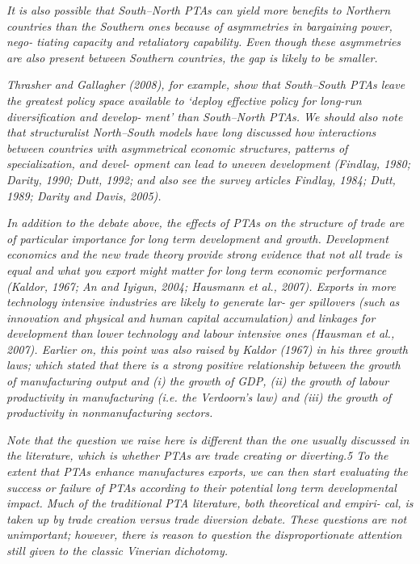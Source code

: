 \emph{It is also possible that South--North PTAs can yield more benefits
to Northern countries than the Southern ones because of asymmetries in
bargaining power, nego- tiating capacity and retaliatory capability.
Even though these asymmetries are also present between Southern
countries, the gap is likely to be smaller.}

\emph{Thrasher and Gallagher (2008), for example, show that South--South
PTAs leave the greatest policy space available to `deploy effective
policy for long-run diversification and develop- ment' than South--North
PTAs. We should also note that structuralist North--South models have
long discussed how interactions between countries with asymmetrical
economic structures, patterns of specialization, and devel- opment can
lead to uneven development (Findlay, 1980; Darity, 1990; Dutt, 1992; and
also see the survey articles Findlay, 1984; Dutt, 1989; Darity and
Davis, 2005).}

\emph{In addition to the debate above, the effects of PTAs on the
structure of trade are of particular importance for long term
development and growth. Development economics and the new trade theory
provide strong evidence that not all trade is equal and what you export
might matter for long term economic performance (Kaldor, 1967; An and
Iyigun, 2004; Hausmann et al., 2007). Exports in more technology
intensive industries are likely to generate lar- ger spillovers (such as
innovation and physical and human capital accumulation) and linkages for
development than lower technology and labour intensive ones (Hausman et
al., 2007). Earlier on, this point was also raised by Kaldor (1967) in
his three growth laws; which stated that there is a strong positive
relationship between the growth of manufacturing output and (i) the
growth of GDP, (ii) the growth of labour productivity in manufacturing
(i.e. the Verdoorn's law) and (iii) the growth of productivity in
nonmanufacturing sectors.}

\emph{Note that the question we raise here is different than the one
usually discussed in the literature, which is whether PTAs are trade
creating or diverting.5 To the extent that PTAs enhance manufactures
exports, we can then start evaluating the success or failure of PTAs
according to their potential long term developmental impact. Much of the
traditional PTA literature, both theoretical and empiri- cal, is taken
up by trade creation versus trade diversion debate. These questions are
not unimportant; however, there is reason to question the
disproportionate attention still given to the classic Vinerian
dichotomy.}

